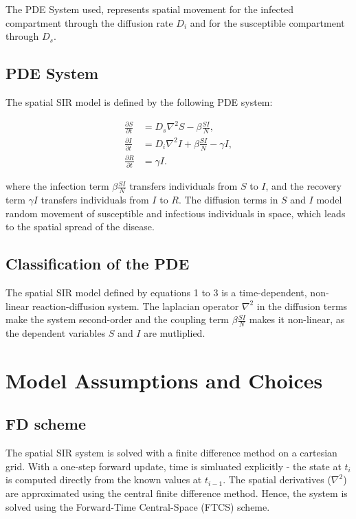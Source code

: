 \documentclass[
  letterpaper,
  DIV=11,
  numbers=noendperiod]{scrartcl}
\begin{document}
The PDE System used, represents spatial movement for the infected
compartment through the diffusion rate \(D_i\) and for the susceptible
compartment through \(D_s\).

\subsection{PDE System}\label{pde-system}

The spatial SIR model is defined by the following PDE system:

\[ \begin{align} \frac{\partial S}{\partial t} &= D_s \nabla^2 S -\beta \frac{S I}{N}, \tag{1}\\ \frac{\partial I}{\partial t} &= D_i \nabla^2 I + \beta \frac{S I}{N} - \gamma I, \tag{2}\\ \frac{\partial R}{\partial t} &= \gamma I. \tag{3} \end{align} \]

where the infection term \(\beta \frac{SI}{N}\) transfers individuals
from \(S\) to \(I\), and the recovery term \(\gamma I\) transfers
individuals from \(I\) to \(R\). The diffusion terms in \(S\) and \(I\)
model random movement of susceptible and infectious individuals in
space, which leads to the spatial spread of the disease.

\subsection{Classification of the PDE}\label{classification-of-the-pde}

The spatial SIR model defined by equations 1 to 3 is a time-dependent,
non-linear reaction-diffusion system. The laplacian operator
\(\nabla^2\) in the diffusion terms make the system second-order and the
coupling term \(\beta \frac{SI}{N}\) makes it non-linear, as the
dependent variables \(S\) and \(I\) are mutliplied.

\section{Model Assumptions and
Choices}\label{model-assumptions-and-choices}

\subsection{FD scheme}\label{fd-scheme}

The spatial SIR system is solved with a finite difference method on a
cartesian grid. With a one-step forward update, time is simluated
explicitly - the state at \(t_i\) is computed directly from the known
values at \(t_{i-1}\). The spatial derivatives (\(\nabla^2\)) are
approximated using the central finite difference method. Hence, the
system is solved using the Forward-Time Central-Space (FTCS) scheme.
\end{document}
